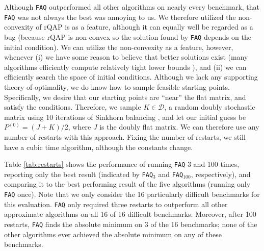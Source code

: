 \documentclass[11pt]{article}
\providecommand{\mc}[1]{\mathcal{#1}}
\newcommand{\FAQ}{\texttt{FAQ} }
\begin{document}
Although \FAQ outperformed all other algorithms on nearly every benchmark, that \FAQ was not always the best was annoying to us.
% 
We therefore utilized the non-convexity of rQAP is as a feature, although it can equally well be regarded as a bug  (because rQAP is non-convex so the solution found by \FAQ depends on the initial condition).  We can utilize the non-convexity as a feature, however, whenever (i) we have some reason to believe that better solutions exist (many algorithms efficiently compute relatively tight lower bounds \cite{Anstreicher2009}), and (ii) we can efficiently search the space of initial conditions.  Although we lack any supporting theory of optimality, we do know how to sample feasible starting points.  Specifically, we desire that our starting points are ``near'' the flat matrix, and satisfy the conditions.  Therefore, we  sample $K \in \mc{D}$, a random doubly stochastic matrix using 10 iterations of Sinkhorn balancing \cite{Sinkhorn1964}, and let our initial guess be $P^{(0)}=(J+K)/2$, where $J$ is the doubly flat matrix.  We can therefore use any number of restarts with this approach.  Fixing the number of restarts, we still have a cubic time algorithm, although the constants change.  

Table \ref{tab:restarts} shows the performance of running \FAQ 3 and 100 times, reporting only the best result (indicated by \texttt{FAQ}$_3$ and \texttt{FAQ}$_{100}$, respectively), and comparing it to the best performing result of the five algorithms (running only \FAQ once). Note that we only consider the 16 particularly difficult benchmarks for this evaluation. \FAQ only required three restarts to outperform all other approximate algorithms on all 16 of 16 difficult benchmarks.  Moreover, after 100 restarts, \FAQ finds the absolute minimum on 3 of the 16 benchmarks; none of the other algorithms ever achieved the absolute minimum on any of these benchmarks. 
\end{document}
